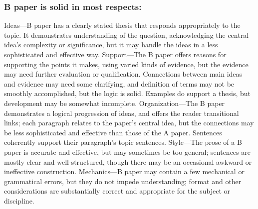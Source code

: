 \documentclass{article}
\begin{document}
\subsubsection{B paper is solid in most respects:}
Ideas---B paper has a clearly stated thesis that responds appropriately to the topic. It demonstrates understanding of the question, acknowledging the central idea's complexity or significance, but it may handle the ideas in a less sophisticated and effective way. Support---The B paper offers reasons for supporting the points it makes, using varied kinds of evidence, but the evidence may need further evaluation or qualification. Connections between main ideas and evidence may need some clarifying, and definition of terms may not be smoothly accomplished, but the logic is solid. Examples do support a thesis, but development may be somewhat incomplete. Organization---The B paper demonstrates a logical progression of ideas, and offers the reader transitional links; each paragraph relates to the paper's central idea, but the connections may be less sophisticated and effective than those of the A paper. Sentences coherently support their paragraph's topic sentences. Style---The prose of a B paper is accurate and effective, but may sometimes be too general; sentences are mostly clear and well-structured, though there may be an occasional awkward or ineffective construction. Mechanics---B paper may contain a few mechanical or grammatical errors, but they do not impede understanding; format and other considerations are substantially correct and appropriate for the subject or discipline.
\end{document}
